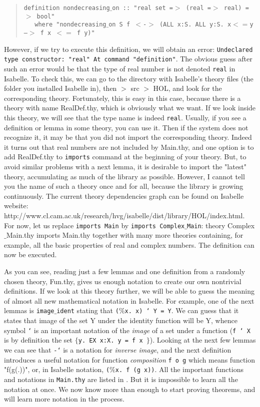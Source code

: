 \documentclass[11pt]{article}
\newcommand{\inds}{\phantom{a}\,\,\,}
\newcommand{\prog}[1]{\par\noindent\begin{quote}#1\end{quote}\par\noindent}
\begin{document}
\prog{\tt definition nondecreasing$\_$on :: "real set =$>$ (real =$>$ real) =$>$ bool" \\
    \inds where "nondecreasing$\_$on S f $<$-$>$ (ALL x:S. ALL y:S. x$<=$y --$>$ f x $<=$ f y)"}%

However, if we try to execute this definition, we will obtain an error: {\tt Undeclared type constructor: "real" At command "definition"}. The obvious guess after such an error would be that the type of real number is not denoted {\tt real} in Isabelle. To check this, we can go to the directory with Isabelle's theory files (the folder you installed Isabelle in), then $>$ src $>$ HOL, and look for the corresponding theory. Fortunately, this is easy in this case, because there is a theory with name RealDef.thy, which is obviously what we want. If we look inside this theory, we will see that the type name is indeed {\tt real}. Usually, if you see a definition or lemma in some theory, you can use it. Then if the system does not recognize it, it may be that you did not import the corresponding theory. Indeed it turns out that real numbers are not included by Main.thy, and one option is to add RealDef.thy to {\tt imports} command at the beginning of your theory. But, to avoid similar problems with a next lemma, it is desirable to import the "latest" theory, accumulating as much of the library as possible. However, I cannot tell you the name of such a theory once and for all, because the library is growing continuously. The current theory dependencies graph can be found on Isabelle website: http://www.cl.cam.ac.uk/research/hvg/isabelle/dist/library/HOL/index.html.
For now, let us replace {\tt imports Main} by {\tt imports Complex$\_$Main}: theory Complex$\_$Main.thy imports Main.thy together with many more theories containing, for example, all the basic properties of real and complex numbers. The definition can now be executed.

As you can see, reading just a few lemmas and one definition from a randomly chosen theory, Fun.thy, gives us enough notation to create our own nontrivial definitions. If we look at this theory further, we will be able to guess the meaning of almost all new mathematical notation in Isabelle. For example, one of the next lemmas is {\tt image$\_$ident} stating that {\tt ($\%$x.~x) ` Y = Y}. We can guess that it states that image of the set Y under the identity function will be Y, whence symbol {\tt `} is an important notation of the \emph{image} of a set under a function ({\tt f ` X} is by definition the set {\tt $\{$y.~EX x:X.~y = f x $\}$}). Looking at the next few lemmas we can see that {\tt -`} is a notation for \emph{inverse image}, and the next definition introduces a useful notation for function \emph{composition} {\tt f o g} which means function "f(g(.))", or, in Isabelle notation, {\tt ($\%$x.~f (g x))}. All the important functions and notations in {\tt Main.thy} are listed in \cite{main}.
But it is impossible to learn all the notation at once. We now know more than enough to start proving theorems, and will learn more notation in the process.
\end{document}
